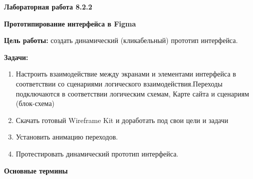 
\graphicspath{ {8.2.2/models/} }
\usepackage{hyperref}

\pagestyle{fancy}
\fancyhead{}
\renewcommand{\headrulewidth}{0pt}


\begin{center}
    \textbf{Лабораторная работа 8.2.2}

    \textbf{Прототипирование интерфейса в Figma}
\end{center}

\textbf{Цель работы:} создать динамический (кликабельный) прототип интерфейса.
\bigskip

\textbf{Задачи:}

\begin{enumerate}
    \item Настроить взаимодействие между экранами и элементами интерфейса в соответствии со сценариями логического взаимодействия.Переходы подключаются в соответствии логическим схемам, Карте сайта и сценариям (блок-схема)
    \item Скачать готовый Wireframe Kit и доработать под свои цели и задачи
    \item Установить анимацию переходов.
    \item Протестировать динамический прототип интерфейса.
\end{enumerate}
\bigskip

\textbf{Основные термины}

